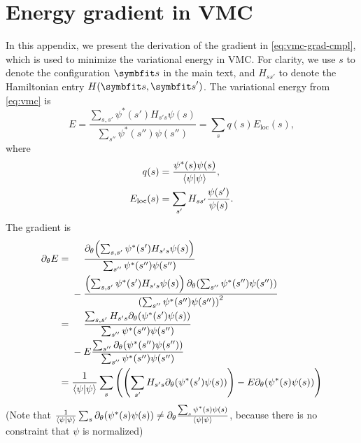 \appendix

\newcommand{\pp}{\partial}

\chapter{Energy gradient in VMC}
\label{append:vmc-grad}

In this appendix, we present the derivation of the gradient in \cref{eq:vmc-grad-cmpl}, which is used to minimize the variational energy in VMC. For clarity, we use $s$ to denote the configuration $\vs$ in the main text, and $H_{s s'}$ to denote the Hamiltonian entry $H(\vs, \vs')$. The variational energy from \cref{eq:vmc} is
\begin{equation}
E = \frac{\sum_{s, s'} \psi^*(s') H_{s' s} \psi(s)}{\sum_{s''} \psi^*(s'') \psi(s'')}
= \sum_s q(s) E_\text{loc}(s),
\end{equation}
where
\begin{align}
q(s) &= \frac{\psi^*(s) \psi(s)}{\ip{\psi}}, \\
E_\text{loc}(s) &= \sum_{s'} H_{s s'} \frac{\psi(s')}{\psi(s)}.
\end{align}
The gradient is
\begin{align}
\pp_\theta E &= \phantom{{}-{}}\frac{\pp_\theta\!\left( \sum_{s, s'} \psi^*(s') H_{s' s} \psi(s) \right)}{\sum_{s''} \psi^*(s'') \psi(s'')} \nonumber \\
&\phantom{{}={}}- \frac{\left( \sum_{s, s'} \psi^*(s') H_{s' s} \psi(s) \right) \pp_\theta\!\left( \sum_{s''} \psi^*(s'') \psi(s'') \right)}{\left( \sum_{s''} \psi^*(s'') \psi(s'') \right)^2} \\
&= \phantom{{}-{}}\frac{\sum_{s, s'} H_{s' s} \pp_\theta\!\left( \psi^*(s') \psi(s) \right)}{\sum_{s''} \psi^*(s'') \psi(s'')} \nonumber \\
&\phantom{{}={}}- E \frac{\sum_{s''} \pp_\theta\!\left( \psi^*(s'') \psi(s'') \right)}{\sum_{s''} \psi^*(s'') \psi(s'')} \\
&= \frac{1}{\ip{\psi}} \sum_s \left( \left( \sum_{s'} H_{s' s} \pp_\theta\!\left( \psi^*(s') \psi(s) \right) \right) - E \pp_\theta\!\left( \psi^*(s) \psi(s) \right) \right)
\end{align}
(Note that $\frac{1}{\ip{\psi}} \sum_s \pp_\theta\!\left( \psi^*(s) \psi(s) \right) \neq \pp_\theta \frac{\sum_s \psi^*(s) \psi(s)}{\ip{\psi}}$, because there is no constraint that $\psi$ is normalized)

